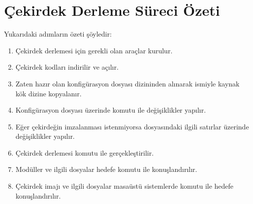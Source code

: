 \documentclass[a4paper,10pt,turkish]{sphinxmanual}
\begin{document}
\section{Çekirdek Derleme Süreci Özeti}
\label{\detokenize{kernelcompilation:cekirdek-derleme-sureci-ozeti}}
\sphinxAtStartPar
Yukarıdaki adımların özeti şöyledir:
\begin{enumerate}
%
\item {} 
\sphinxAtStartPar
Çekirdek derlemesi için gerekli olan araçlar kurulur.

\item {} 
\sphinxAtStartPar
Çekirdek kodları indirilir ve açılır.

\item {} 
\sphinxAtStartPar
Zaten hazır olan konfigürasyon dosyası  dizininden alınarak  ismiyle kaynak
kök dizine kopyalanır.

\item {} 
\sphinxAtStartPar
Konfigürasyon dosyası üzerinde  komutu ile değişiklikler yapılır.

\item {} 
\sphinxAtStartPar
Eğer çekirdeğin imzalanması istenmiyorsa  dosyasındaki ilgili satırlar üzerinde
değişiklikler yapılır.

\item {} 
\sphinxAtStartPar
Çekirdek derlemesi  komutu ile gerçekleştirilir.

\item {} 
\sphinxAtStartPar
Modüller ve ilgili dosyalar hedefe  komutu ile konuşlandırılır.

\item {} 
\sphinxAtStartPar
Çekirdek imajı ve ilgili dosyalar masaüstü sistemlerde  komutu ile hedefe
konuşlandırılır.

\end{enumerate}
\end{document}
